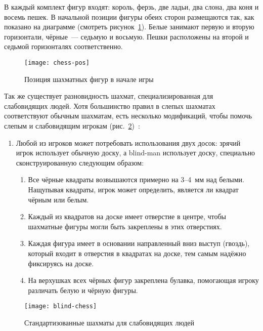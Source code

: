В каждый комплект фигур входят: король, ферзь, две ладьи, два слона, два коня и
восемь пешек. В начальной позиции фигуры обеих сторон размещаются так, как
показано на диаграмме (смотреть рисунок~\ref{fig:chess-pos}). Белые занимают
первую и вторую горизонтали, чёрные — седьмую и восьмую. Пешки расположены на
второй и седьмой горизонталях соответственно. 

\begin{figure}[htpb]
    \centering
    \texttt{[image: chess-pos]}
    \caption{Позиция шахматных фигур в начале игры}%
    \label{fig:chess-pos}
\end{figure}

Так же существует разновидность шахмат, специализированная для слабовидящих
людей. Хотя большинство правил в слепых шахматах соответствуют обычным
шахматам, есть несколько модификаций, чтобы помочь слепым и слабовидящим
игрокам (рис.~\ref{fig:blind-chess})~\cite{web:wiki-ibca}:
\begin{enumerate}
    \item Любой из игроков может потребовать использования двух досок: зрячий
        игрок использует обычную доску, а \gls{blind-man} использует доску,
        специально сконструированную следующим образом: 
        \begin{enumerate}
            \item Все чёрные квадраты возвышаются примерно на 3--4 мм над
                белыми. Нащупывая квадраты, игрок может определить, является ли
                квадрат чёрным или белым.
            \item Каждый из квадратов на доске имеет отверстие в центре, чтобы
                шахматные фигуры могли быть закреплены в этих отверстиях.
            \item Каждая фигура имеет в основании направленный вниз выступ
                (гвоздь), который входит в отверстия в квадратах на доске, тем
                самым надёжно фиксируясь на доске.
            \item На верхушках всех чёрных фигур закреплена булавка, помогающая
                игроку различать белую и чёрную фигуры.
        \end{enumerate}
\end{enumerate}
\begin{figure}[H]
    \centering
    \texttt{[image: blind-chess]}
    \caption{Стандартизованные шахматы для слабовидящих людей}\label{fig:blind-chess}
\end{figure}

